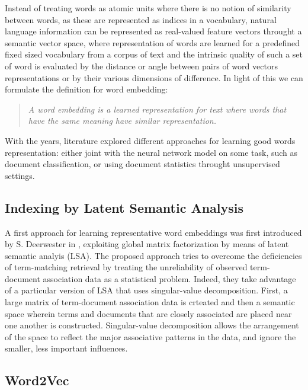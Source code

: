 Instead of treating words as atomic units where there is no notion of
similarity between words, as these are represented as indices in a
vocabulary, natural language information can be represented as
real-valued feature vectors throught a semantic vector space, where
representation of words are learned for a predefined fixed sized
vocabulary from a corpus of text and the intrinsic quality of such a
set of word is evaluated by the distance or angle between pairs of
word vectors representations or by their various dimensions of
difference. In light of this we
can formulate the definition for word embedding: 

\begin{quote}
    \textit{A word embedding is a learned representation for text
    where words that have the same meaning have similar
    representation.}
\end{quote}

With the years, literature explored different approaches for learning
good words representation: either joint with the neural network model
on some task, such as document classification, or using document
statistics throught unsupervised settings.

\subsection{Indexing by Latent Semantic Analysis}

A first approach for learning representative word embeddings was first
introduced by S. Deerwester \etal{} in , exploiting global matrix factorization by means of latent
semantic analyis (LSA). The proposed approach tries to overcome the
deficiencies of term-matching retrieval by treating the unreliability
of observed term-document association data as a statistical problem.
Indeed, they take advantage of a particular version of LSA that uses
singular-value decomposition. First, a large matrix of term-document
association data is crteated and then a semantic space wherein terms
and documents that are closely associated are placed near one another
is constructed. Singular-value decomposition allows the arrangement of
the space to reflect the major associative patterns in the data, and
ignore the smaller, less important influences.

\subsection{Word2Vec}

